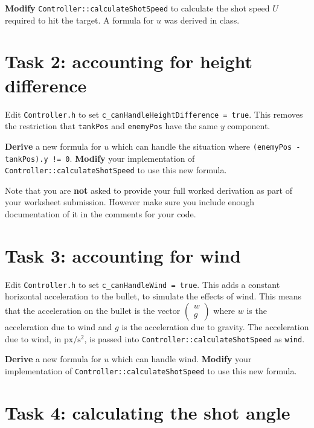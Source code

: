 \documentclass{../../../fal_assignment}
\begin{document}
\textbf{Modify} \lstinline{Controller::calculateShotSpeed} to calculate the shot speed $U$ required to hit the target.
A formula for $u$ was derived in class.

\section*{Task 2: accounting for height difference}

Edit \texttt{Controller.h} to set \lstinline{c_canHandleHeightDifference = true}.
This removes the restriction that \lstinline{tankPos} and \lstinline{enemyPos} have the same $y$ component.

\textbf{Derive} a new formula for $u$ which can handle the situation where \linebreak \lstinline{(enemyPos - tankPos).y != 0}.
\textbf{Modify} your implementation of \linebreak \lstinline{Controller::calculateShotSpeed} to use this new formula.

Note that you are \textbf{not} asked to provide your full worked derivation as part of your worksheet submission.
However make sure you include enough documentation of it in the comments for your code.

\section*{Task 3: accounting for wind}

Edit \texttt{Controller.h} to set \lstinline{c_canHandleWind = true}.
This adds a constant horizontal acceleration to the bullet, to simulate the effects of wind.
This means that the acceleration on the bullet is the vector $ \left( \begin{matrix} w \\ g \end{matrix} \right) $
where $w$ is the acceleration due to wind and $g$ is the acceleration due to gravity.
The acceleration due to wind, in $\text{px} / \text{s}^2$, is passed into \lstinline{Controller::calculateShotSpeed} as \lstinline{wind}.

\textbf{Derive} a new formula for $u$ which can handle wind.
\textbf{Modify} your implementation of \lstinline{Controller::calculateShotSpeed} to use this new formula.

\section*{Task 4: calculating the shot angle}
\end{document}
